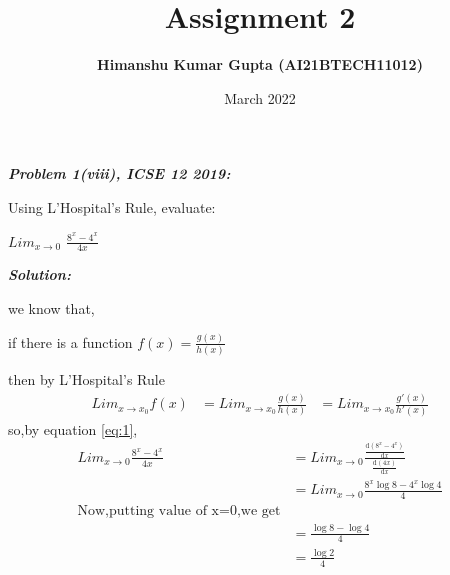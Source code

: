 \documentclass[journal,12pt,twocolumn]{IEEEtran}
\begin{document}
\newcommand{\myvec}[1]{\ensuremath{\begin{pmatrix}#1\end{pmatrix}}}

\let\vec\mathbf


\title{Assignment 2}
\author{\textbf{Himanshu Kumar Gupta (AI21BTECH11012)}}
\maketitle
\date {March 2022}


\textbf{\textit{Problem 1(viii), ICSE 12 2019:}}

Using L’Hospital’s Rule, evaluate:

 $Lim_{x\rightarrow0}$ $\frac{8^x-4^x}{4x}$

\textbf{\textit{Solution:}}

we know that,

if there is a function $f(x)=\frac{g(x)}{h(x)}$

then by L’Hospital’s Rule 
\begin{align}
\label{eq:1}
Lim_{x\rightarrow x_0}f(x)&=Lim_{x\rightarrow x_0}\frac{g(x)}{h(x)}
&=Lim_{x\rightarrow x_0}\frac{g'(x)}{h'(x)}
\end{align}
so,by equation \eqref{eq:1},
\begin{align}
Lim_{x\rightarrow0}\frac{8^x-4^x}{4x}&=Lim_{x\rightarrow0}\frac{\frac{\mathrm{d}(8^x-4^x)}{\mathrm{d}x}}{\frac{\mathrm{d}(4x)}{\mathrm{d}x}}         \\
&=Lim_{x\rightarrow0}\frac{8^x\log{8}-4^x\log{4}}{4}\\
\text{Now,putting value of x=0,we get}       \nonumber\\
&=\frac{\log{8}-\log{4}}{4}       \\
&=\frac{\log{2}}{4}
\end{align}
\end{document}
